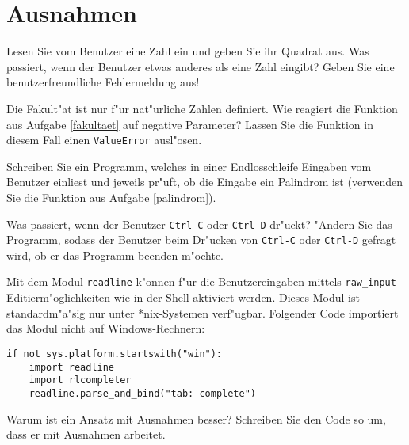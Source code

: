 \section*{Ausnahmen}
\begin{aufgabe}
Lesen Sie vom Benutzer eine Zahl ein und geben Sie ihr Quadrat aus. Was passiert, wenn der Benutzer etwas anderes als eine Zahl eingibt? Geben Sie eine benutzerfreundliche Fehlermeldung aus!
\end{aufgabe}

\begin{aufgabe}
Die Fakult"at ist nur f"ur nat"urliche Zahlen definiert. Wie reagiert die Funktion aus Aufgabe \ref{fakultaet} auf negative Parameter? Lassen Sie die Funktion in diesem Fall einen \texttt{ValueError} ausl"osen.
\end{aufgabe}

\begin{aufgabe}Schreiben Sie ein Programm, welches in einer Endlosschleife Eingaben vom Benutzer einliest und jeweils pr"uft, ob die Eingabe ein Palindrom ist (verwenden Sie die Funktion aus Aufgabe \ref{palindrom}). 

Was passiert, wenn der Benutzer \texttt{Ctrl-C} oder \texttt{Ctrl-D} dr"uckt? "Andern Sie das Programm, sodass der Benutzer beim Dr"ucken von \texttt{Ctrl-C} oder \texttt{Ctrl-D} gefragt wird, ob er das Programm beenden m"ochte.
\end{aufgabe}

\newpage

\begin{aufgabe}
Mit dem Modul \texttt{readline} k"onnen f"ur die Benutzereingaben mittels \texttt{raw\_input} Editierm"oglichkeiten wie in der Shell aktiviert werden. Dieses Modul ist standardm"a"sig nur unter *nix-Systemen verf"ugbar. Folgender Code importiert das Modul nicht auf Windows-Rechnern:
\begin{lstlisting}
if not sys.platform.startswith("win"):
    import readline
    import rlcompleter
    readline.parse_and_bind("tab: complete")
\end{lstlisting}
Warum ist ein Ansatz mit Ausnahmen besser? Schreiben Sie den Code so um, dass er mit Ausnahmen arbeitet.
\end{aufgabe}

